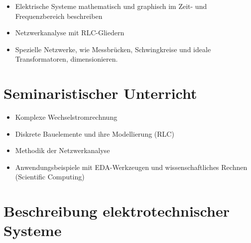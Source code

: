 \documentclass[
  ngerman,
  letterpaper,
]{scrbook}
\begin{document}
\begin{itemize}
\item
  Elektrische Systeme mathematisch und graphisch im Zeit- und
  Frequenzbereich beschreiben
\item
  Netzwerkanalyse mit RLC-Gliedern
\item
  Spezielle Netzwerke, wie Messbrücken, Schwingkreise und ideale
  Transformatoren, dimensionieren.
\end{itemize}

\section{Seminaristischer Unterricht}\label{seminaristischer-unterricht}

\begin{itemize}
\item
  Komplexe Wechselstromrechnung
\item
  Diskrete Bauelemente und ihre Modellierung (RLC)
\item
  Methodik der Netzwerkanalyse
\item
  Anwendungsbeispiele mit EDA-Werkzeugen und wissenschaftliches Rechnen
  (Scientific Computing)
\end{itemize}

\section{Beschreibung elektrotechnischer
Systeme}\label{beschreibung-elektrotechnischer-systeme}
\end{document}
